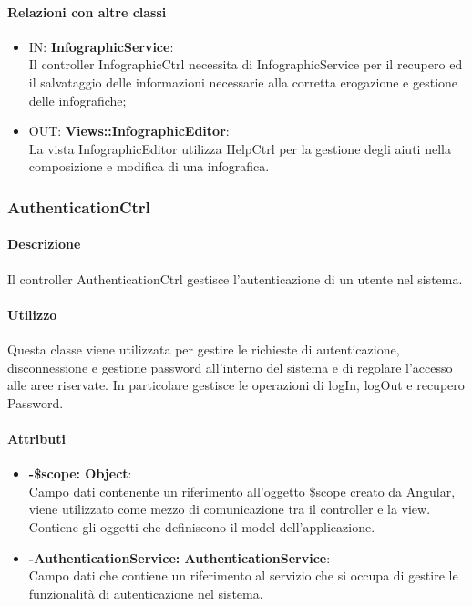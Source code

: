 	\paragraph{Relazioni con altre classi}
	\begin{itemize}
		\item IN: \textbf{InfographicService}:\\
			Il controller InfographicCtrl necessita di InfographicService per il recupero ed il salvataggio delle informazioni necessarie alla corretta erogazione e gestione delle infografiche;
		\item OUT: \textbf{Views::InfographicEditor}:\\
			La vista InfographicEditor utilizza HelpCtrl per la gestione degli aiuti nella composizione e modifica di una infografica. 	
	\end{itemize}

\newpage	
\subsubsection{AuthenticationCtrl}	
\paragraph{Descrizione}
	Il controller AuthenticationCtrl gestisce l'autenticazione di un utente nel sistema.
	
	\paragraph{Utilizzo}
	Questa classe viene utilizzata per gestire le richieste di autenticazione, disconnessione e gestione password all'interno del sistema e di regolare l'accesso alle aree riservate.
	In particolare gestisce le operazioni di logIn, logOut e recupero Password.
	\paragraph{Attributi}
	\begin{itemize}
		\item \textbf{-\$scope: Object}:\\
			Campo dati contenente un riferimento all'oggetto \$scope creato da Angular, viene utilizzato come mezzo di comunicazione tra il controller e la view. Contiene gli oggetti che definiscono il model dell'applicazione.
		\item \textbf{-AuthenticationService: AuthenticationService}:\\
			Campo dati che contiene un riferimento al servizio che si occupa di gestire le funzionalità di autenticazione nel sistema.
	\end{itemize}
	
